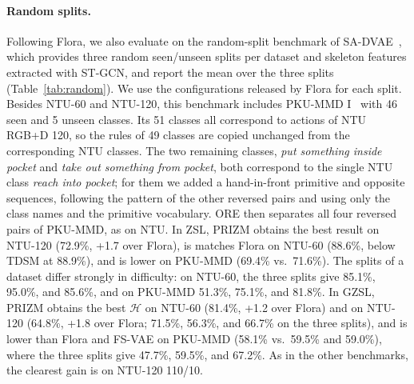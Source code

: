 \documentclass[11pt]{article}
\begin{document}
\paragraph{Random splits.}
Following Flora, we also evaluate on the random-split benchmark of SA-DVAE~\cite{savae24}, which provides three random seen/unseen splits per dataset and skeleton features extracted with ST-GCN, and report the mean over the three splits (Table~\ref{tab:random}). We use the configurations released by Flora for each split. Besides NTU-60 and NTU-120, this benchmark includes PKU-MMD I~\cite{pku} with 46 seen and 5 unseen classes. Its 51 classes all correspond to actions of NTU RGB+D 120, so the rules of 49 classes are copied unchanged from the corresponding NTU classes. The two remaining classes, \emph{put something inside pocket} and \emph{take out something from pocket}, both correspond to the single NTU class \emph{reach into pocket}; for them we added a hand-in-front primitive and opposite sequences, following the pattern of the other reversed pairs and using only the class names and the primitive vocabulary. ORE then separates all four reversed pairs of PKU-MMD, as on NTU. In ZSL, PRIZM obtains the best result on NTU-120 (72.9\%, +1.7 over Flora), is matches Flora on NTU-60 (88.6\%, below TDSM at 88.9\%), and is lower on PKU-MMD (69.4\% vs.\ 71.6\%). The splits of a dataset differ strongly in difficulty: on NTU-60, the three splits give 85.1\%, 95.0\%, and 85.6\%, and on PKU-MMD 51.3\%, 75.1\%, and 81.8\%. In GZSL, PRIZM obtains the best $\mathcal{H}$ on NTU-60 (81.4\%, +1.2 over Flora) and on NTU-120 (64.8\%, +1.8 over Flora; 71.5\%, 56.3\%, and 66.7\% on the three splits), and is lower than Flora and FS-VAE on PKU-MMD (58.1\% vs.\ 59.5\% and 59.0\%), where the three splits give 47.7\%, 59.5\%, and 67.2\%. As in the other benchmarks, the clearest gain is on NTU-120 110/10.
\end{document}
